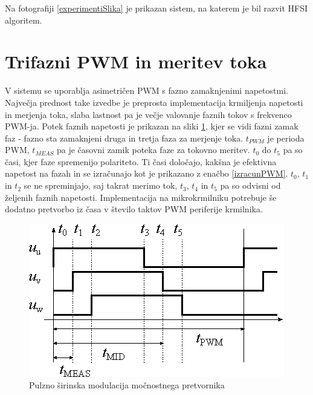 \documentclass[a4paper,twoside,openright,12pt,slovene]{book}
\begin{document}
Na fotografiji \ref{experimentiSlika} je prikazan sistem, na katerem je bil razvit HFSI algoritem. 

\section{Trifazni PWM in meritev toka}

V sistemu se uporablja asimetričen PWM s fazno zamaknjenimi napetostmi. Največja prednost take izvedbe je preprosta implementacija krmiljenja napetosti in merjenja toka, slaba lastnost pa je večje
valovanje faznih tokov s frekvenco PWM-ja. Potek faznih napetosti je prikazan na sliki \ref{PWM}, kjer se vidi fazni zamak faz - fazno sta zamaknjeni druga in tretja faza za merjenje toka. $t_{PWM}$
je perioda PWM, $t_{MEAS}$ pa je časovni zamik poteka faze za tokovno meritev. $t_0$ do $t_5$ pa so časi, kjer faze spremenijo polariteto. Ti časi določajo, kakšna je efektivna napetost na fazah in se
izračunajo kot je prikazano z enačbo \ref{izracunPWM}. $t_0$, $t_1$ in $t_2$ se ne spreminjajo, saj takrat merimo tok, $t_3$, $t_4$ in $t_5$ pa so odvisni od željenih faznih napetosti. Implementacija
na mikrokrmilniku potrebuje še dodatno pretvorbo iz časa v število taktov PWM periferije krmilnika.

\begin{figure}[!htbp]
    \centering
    \includegraphics[width=1\columnwidth]{Slike/Inkscape/PWM.eps}
    \caption{\label{PWM} Pulzno širinska modulacija močnostnega pretvornika }
\end{figure}
\end{document}
